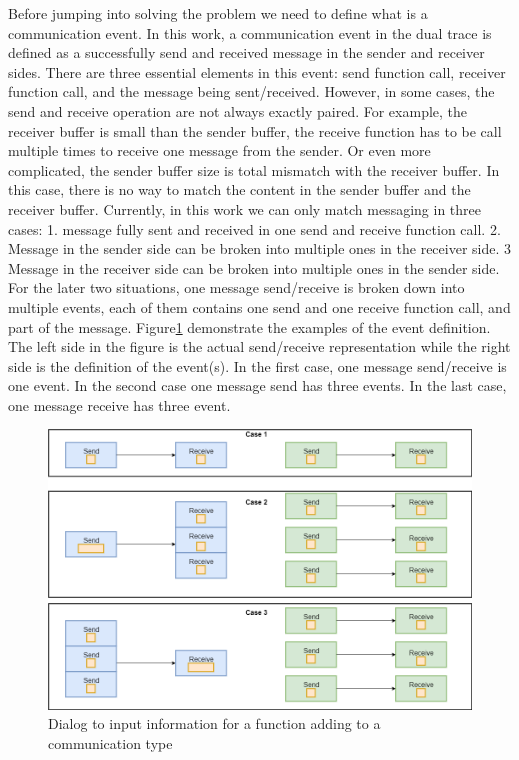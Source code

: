 \documentclass[paper=a4, fontsize=11pt]{scrartcl}
\numberwithin{equation}{section}		%
\numberwithin{figure}{section}			%
\numberwithin{table}{section}				%
\begin{document}
Before jumping into solving the problem we need to define what is a communication event. In this work, a communication event in the dual trace is defined as a successfully send and received message in the sender and receiver sides. There are three essential elements in this event: send function call, receiver function call, and the message being sent/received. However, in some cases, the send and receive operation are not always exactly paired. For example, the receiver buffer is small than the sender buffer, the receive function has to be call multiple times to receive one message from the sender. Or even more complicated, the sender buffer size is total mismatch with the receiver buffer. In this case, there is no way to match the content in the sender buffer and the receiver buffer. Currently, in this work we can only match messaging in three cases: 1. message fully sent and received in one send and receive function call. 2. Message in the sender side can be broken into multiple ones in the receiver side. 3 Message in the receiver side can be broken into multiple ones in the sender side. For the later two situations, one message send/receive is broken down into multiple events, each of them contains one send and one receive function call, and part of the message. Figure\ref{event} demonstrate the examples of the event definition. The left side in the figure is the actual send/receive representation while the right side is the definition of the event(s). In the first case, one message send/receive is one event. In the second case one message send has three events. In the last case, one message receive has three event.

\begin{figure}[h]
\includegraphics[scale=.415]{event}
 \caption{Dialog to input information for a function adding to a communication type}
\label{event}
\end{figure}
\end{document}
